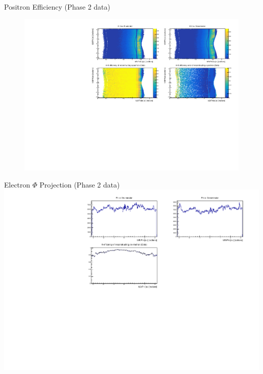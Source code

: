 \documentclass[10pt]{beamer}
\begin{document}
\begin{frame}{Positron Efficiency (Phase 2 data)}
	
	\begin{figure}
		\centering
		\includegraphics[width=\textwidth]{Plots/Eff/TPepEff_Data}
	\end{figure}
	
\end{frame}








\begin{frame}{Electron $\Phi$ Projection (Phase 2 data)}
	\centering
	\includegraphics[width=\textwidth]{Plots/Eff/emPhiPro_Data}
\end{frame}
\end{document}
